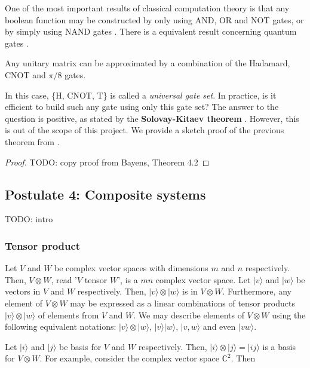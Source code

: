 One of the most important results of classical computation theory is that any boolean function may be constructed by only using AND, OR and NOT gates, or by simply using NAND gates \cite{Lau2006}. There is a equivalent result concerning quantum gates \cite{Bayens2020}.

\begin{theorem}
	Any unitary matrix can be approximated by a combination of the Hadamard, CNOT and $\pi/8$ gates.
\end{theorem}

In this case, \{H, CNOT, T\} is called a \emph{universal gate set}. In practice, is it efficient to build such any gate using only this gate set? The answer to the question is positive, as stated by the \textbf{Solovay-Kitaev theorem} \cite{Dawson2006}. However, this is out of the scope of this project. We provide a sketch proof of the previous theorem from \cite{Bayens2020}.

\begin{proof}
	TODO: copy proof from Bayens, Theorem 4.2
\end{proof}

\subsection{Postulate 4: Composite systems}

TODO: intro

\subsubsection{Tensor product}

Let $V$ and $W$ be complex vector spaces with dimensions $m$ and $n$ respectively. Then, $V \otimes W$, read '$V$ tensor $W$', is a $mn$ complex vector space. Let $|v\rangle$ and $|w\rangle$ be vectors in $V$ and $W$ respectively. Then, $|v\rangle \otimes |w\rangle$ is in $V \otimes W$. Furthermore, any element of $V \otimes W$ may be expressed as a linear combinations of tensor products $|v\rangle \otimes |w\rangle$ of elements from $V$ and $W$. We may describe elements of $V \otimes W$ using the following equivalent notations: $|v\rangle \otimes |w\rangle$, $|v\rangle|w\rangle$, $|v, w\rangle$ and even $|vw\rangle$.

Let $|i\rangle$ and $|j\rangle$ be basis for $V$ and $W$ respectively. Then, $|i\rangle \otimes |j\rangle = |ij\rangle$ is a basis for $V \otimes W$. For example, consider the complex vector space $\mathds{C}^2$. Then

